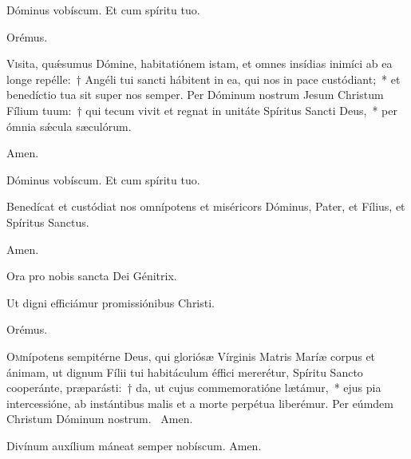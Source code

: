 {} %


\vv Dóminus vobíscum. \rr Et cum spíritu tuo.


Orémus.

\lettrine{V}{i}sita, quǽsumus Dómine, habitatiónem istam, et omnes insídias inimíci ab ea longe repélle:~† Angéli tui sancti hábitent in ea, qui nos in pace custódiant;~* et benedíctio tua sit super nos semper. Per Dóminum nostrum Jesum Christum Fílium tuum:~† qui tecum vivit et regnat in unitáte Spíritus Sancti Deus,~* per ómnia sǽcula sæculórum.

 \rr Amen.

\vv Dóminus vobíscum. \rr Et cum spíritu tuo.



Benedícat et custódiat nos omnípotens et miséricors Dóminus, Pater, \cc{} et Fílius, et Spíritus Sanctus.

\rr Amen.

\label{an_salve_regina_solesmes}
{}

\vv Ora pro nobis sancta Dei Génitrix.

\rr Ut digni efficiámur promissiónibus Christi.

Orémus.

\lettrine{O}{m}nípotens sempitérne Deus, qui gloriósæ Vírginis Matris Maríæ corpus et ánimam, ut dignum Fílii tui habitáculum éffici mererétur, Spíritu Sancto cooperánte, præparásti:~† da, ut cujus commemoratióne lætámur,~* ejus pia intercessióne, ab instántibus malis et a morte perpétua liberémur. Per eúmdem Christum Dóminum nostrum. \rr~Amen.

\vv Divínum \cc{} auxílium máneat semper nobíscum. \rr Amen.



